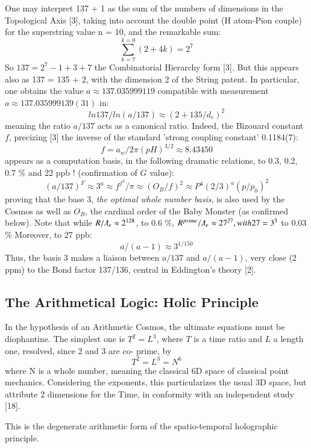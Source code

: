 \documentclass[twoside,draft]{article}
\begin{document}
\begin{sloppypar}
{One may interpret 137 + 1 as
the sum of the numbers of dimensions in the Topological Axis [3], taking into account the double
point (H atom-Pion couple) for the superstring value n = 10, and the remarkable sum:
\begin{equation}
\sum_{k=7}^{k=0}(2 + 4 k ) = 2^{7}
\end{equation}
So $137 = 2^{7} - 1 + 3 + 7$ the Combinatorial Hierarchy form [3]. But this appears also as 137 = 135 + 2,
with the dimension 2 of the String patent. In particular, one obtains the value $a \approx 137.035999119$
compatible with measurement $a \approx 137.035999139(31)$ in:
\begin{equation}
ln137/ln(a/137) \approx (2+135/d_{e})^{2}
\end{equation}
meaning the ratio $a/137$ acts as a canonical ratio. Indeed, the Bizouard constant $f$, precizing [3] the inverse of the standard 'strong coupling constant' 0.1184(7): $$f = a_w/2\pi(pH)^{3/2} \approx 8.43450$$ appears as a computation basis, in the following dramatic relations, to 0.3, 0.2, 0.7 \% and 22 ppb ! (confirmation of $G$ value):
$$(a/137)^F \approx 3^a \approx f^{f^2}/\pi \approx (O_B/f)^2 \approx P^4 (2/3)^a (p/p_0)^2 $$
proving that the base 3, \textit{the optimal whole number basis}, is also used by the Cosmos as well as $O_B$, the cardinal order  of the Baby Monster (as confirmed below). 
Note that while $R/\lambdabar_e \approx 2^{128}$, to 0.6 \%, $R^{prime}/\lambdabar_e \approx 27^{27}, with 27 = 3^3$ to 0.03 \%  Moreover, to 27 ppb:
$$ a/(a-1) \approx 3^{1/150} $$
Thus, the basis 3 makes a liaison between $a/137$ and $a/(a-1)$, very close (2 ppm) to the Bond factor 137/136, central in Eddington's theory [2].

\subsection{The Arithmetical Logic: Holic Principle}

In the hypothesis of an Arithmetic Cosmos, the ultimate equations must be diophantine. The
simplest one is $T^{2} = L^{3}$, where $T$ is a time ratio and $L$ a length one, resolved, since 2 and 3 are co-
prime, by $$T^{2} = L^{3} = N^{6}$$ where N is a whole number, meaning the classical 6D space of classical point mechanics. Considering the exponents, this particularizes the usual 3D space, but attribute 2 dimensions for the Time, in conformity with an independent study [18].

This is the degenerate arithmetic form of the spatio-temporal holographic principle.

}
\end{sloppypar}
\end{document}
